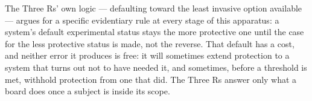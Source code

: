 The Three Rs' own logic — defaulting toward the least invasive option available — argues for a specific evidentiary rule at every stage of this apparatus: a system's default experimental status stays the more protective one until the case for the less protective status is made, not the reverse. That default has a cost, and neither error it produces is free: it will sometimes extend protection to a system that turns out not to have needed it, and sometimes, before a threshold is met, withhold protection from one that did. The Three Rs answer only what a board does once a subject is inside its scope.
